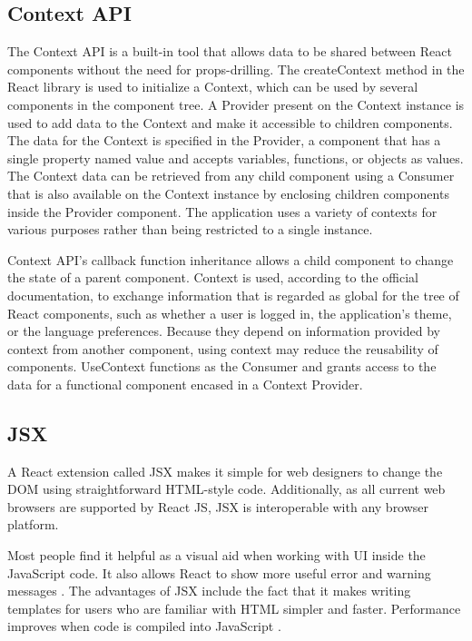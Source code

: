 \subsection*{Context API}
The Context API is a built-in tool that allows data to be shared between React components without the need for props-drilling. The createContext method in the React library is used to initialize a Context, which can be used by several components in the component tree. A Provider present on the Context instance is used to add data to the Context and make it accessible to children components. The data for the Context is specified in the Provider, a component that has a single property named value and accepts variables, functions, or objects as values. The Context data can be retrieved from any child component using a Consumer that is also available on the Context instance by enclosing children components inside the Provider component. The application uses a variety of contexts for various purposes rather than being restricted to a single instance.

Context API's callback function inheritance allows a child component to change the state of a parent component. Context is used, according to the official documentation, to exchange information that is regarded as global for the tree of React components, such as whether a user is logged in, the application's theme, or the language preferences. Because they depend on information provided by context from another component, using context may reduce the reusability of components. UseContext functions as the Consumer and grants access to the data for a functional component encased in a Context Provider.

\subsection*{JSX}
A React extension called JSX makes it simple for web designers to change the DOM using straightforward HTML-style code. Additionally, as all current web browsers are supported by React JS, JSX is interoperable with any browser platform.

Most people find it helpful as a visual aid when working with UI inside the JavaScript code. It also allows React to show more useful error and warning messages \autocite{react2020introducing}. The advantages of JSX include the fact that it makes writing templates for users who are familiar with HTML simpler and faster. Performance improves when code is compiled into JavaScript \autocite{phan2020react}.
